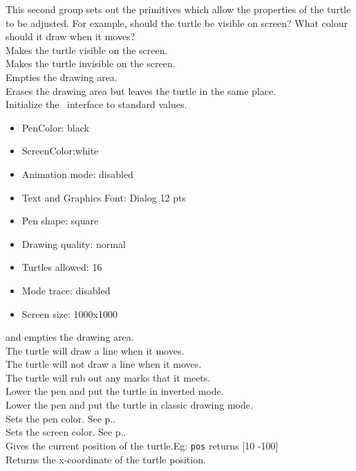 This second group sets out the primitives which allow the properties of the turtle to be adjusted. For example, should the turtle be visible on screen? What colour should it draw when it moves? \\
 Makes the turtle visible on the screen.\\
 Makes the turtle invisible on the screen.\\
 Empties the drawing area.\\
 Erases the drawing area but leaves the turtle in the same place.\\
 Initialize the \xlogo\ interface to standard values.
\begin{itemize}
 \item PenColor: black
 \item ScreenColor:white
 \item Animation mode: disabled 
 \item Text and Graphics Font: Dialog 12 pts
 \item Pen shape: square
 \item Drawing quality: normal
 \item Turtles allowed: 16
 \item Mode trace: disabled
 \item Screen size: 1000x1000
\end{itemize}
and empties the drawing area.\\
 The turtle will draw a line when it moves.\\
 The turtle will not draw a line when it moves.\\
 The turtle will rub out any marks that it meets.\\
 Lower the pen and put the turtle in inverted mode.\\
 Lower the pen and put the turtle in classic drawing mode.\\
 Sets the pen color. See p.\pageref{couleurs}.\\
 Sets the screen color. See p.\pageref{couleurs}.\\
 Gives the current position of the turtle.Eg: \texttt{pos} returns {[}10 -100{]}\\
 Returns the x-coordinate of the turtle position.\\
